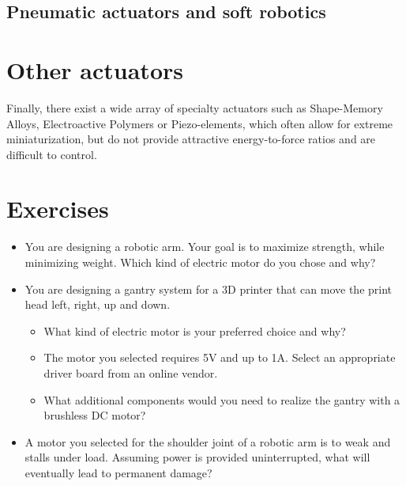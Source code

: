\subsection{Pneumatic actuators and soft robotics}
 
\section{Other actuators} 
 Finally, there exist a wide array of specialty actuators such as Shape-Memory Alloys, Electroactive Polymers or Piezo-elements, which often allow for extreme miniaturization, but do not provide attractive energy-to-force ratios and are difficult to control.

\section{Exercises}
\begin{itemize}
\item You are designing a robotic arm. Your goal is to maximize strength, while minimizing weight. Which kind of electric motor do you chose and why?
\item You are designing a gantry system for a 3D printer that can move the print head left, right, up and down.
\begin{itemize}
\item What kind of electric motor is your preferred choice and why? 
\item The motor you selected requires 5V and up to 1A. Select an appropriate driver board from an online vendor.
\item What additional components would you need to realize the gantry with a brushless DC motor? 
\end{itemize}
\item A motor you selected for the shoulder joint of a robotic arm is to weak and stalls under load. Assuming power is provided uninterrupted, what will eventually lead to permanent damage? 
\end{itemize}
